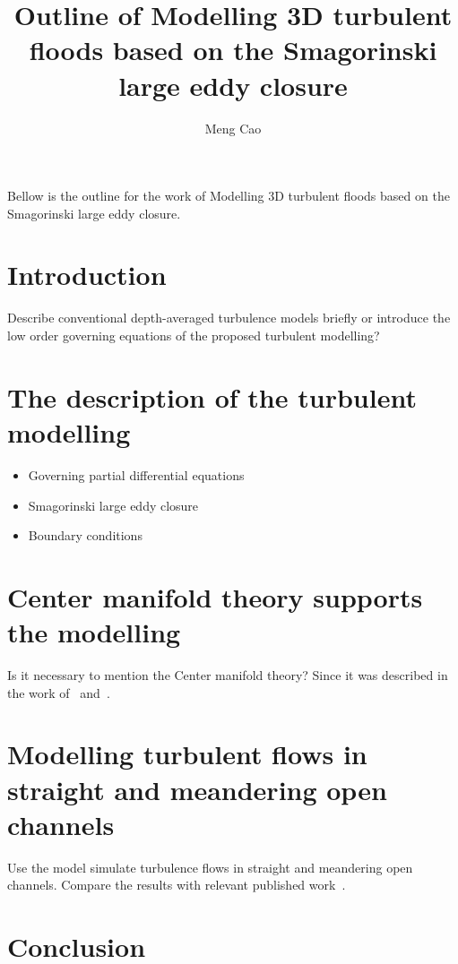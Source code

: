 \documentclass[12pt,a5paper]{article}
\title{Outline of Modelling 3D turbulent floods based on the Smagorinski large eddy closure}
\author{Meng Cao}
\begin{document}
\maketitle            
Bellow is the outline for the work of Modelling 3D turbulent floods based on the Smagorinski large eddy closure.           

\section{Introduction}

Describe conventional depth-averaged turbulence models briefly or introduce the low order governing equations of the proposed turbulent modelling?
                        
\section{The description of the turbulent modelling}
\begin{itemize}
\item Governing partial differential equations
\item Smagorinski large eddy closure
\item Boundary conditions
\end{itemize}
           
\section{Center manifold theory supports the modelling}            
 
Is it necessary to mention the Center manifold theory? Since it was described in the work of~\cite{Roberts2008} and~\cite{Georgiev2008}.            
            
            
\section{Modelling turbulent flows in straight and meandering open channels}            

Use the model simulate turbulence flows in straight and meandering open channels. Compare the results with relevant published work~\cite[e.g.]{Bousmar2002,Liu2009}.  
 
\section{Conclusion} 
 


\end{document}
